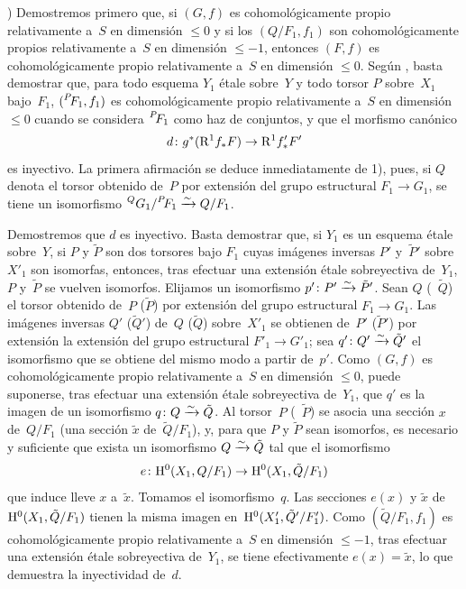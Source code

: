 ) Demostremos primero que, si $(G,f)$ es cohomológicamente propio
relativamente a~$S$ en dimensión $\leqslant 0$ y si los
$(Q/F_1,f_1)$ son cohomológicamente propios relativamente a~$S$ en
dimensión $\leqslant -1$, entonces $(F,f)$ es cohomológicamente propio
relativamente a~$S$ en dimensión $\leqslant 0$. Según
, basta demostrar que, para todo esquema $Y_1$ étale
sobre~$Y$ y todo torsor $P$ sobre~$X_1$ bajo~$F_1$,
$(\leftexp{P\mkern-4mu}{F}_1,f_1)$ es cohomológicamente propio
relativamente a~$S$ en dimensión $\leqslant 0$ cuando se considera
$\leftexp{P\mkern-4mu}{F}_1$ como haz de conjuntos, y que el morfismo
canónico
$$
d \colon g^*(\mathrm{R}^1 f_* F) \to \mathrm{R}^1 f'_* F'
$$
es inyectivo. La primera afirmación se deduce inmediatamente de 1),
pues, si $Q$ denota el torsor obtenido de~$P$ por extensión del grupo
estructural $F_1 \to G_1$, se tiene un isomorfismo
$\leftexp{Q}{G}_1 / \leftexp{P\mkern-4mu}{F}_1 \isomto Q/F_1$.

Demostremos que $d$ es inyectivo. Basta demostrar que, si $Y_1$ es un
esquema étale sobre~$Y$, si $P$ y $\tilde{P}$ son dos torsores bajo
$F_1$ cuyas imágenes inversas $P'$ y~$\tilde{P}'$ sobre~$X'_1$ son
isomorfas, entonces, tras efectuar una extensión étale sobreyectiva
de~$Y_1$, $P$ y~$\tilde{P}$ se vuelven isomorfos. Elijamos un
isomorfismo $p' \colon P' \xrightarrow{\sim} \tilde{P}'$. Sean $Q$
(\resp~$\tilde{Q}$) el torsor obtenido de~$P$ (\resp $\tilde{P}$) por
extensión del grupo estructural $F_1 \to G_1$. Las imágenes inversas
$Q'$ (\resp $\tilde{Q}'$) de~$Q$ (\resp $\tilde{Q}$) sobre~$X'_1$ se
obtienen de~$P'$ (\resp $\tilde{P}'$) por
{extensión}
{la extensión}
del grupo estructural $F'_1 \to G'_1$; sea
$q' \colon Q' \xrightarrow{\sim} \tilde{Q}'$ el isomorfismo que se obtiene del
mismo modo a partir de~$p'$. Como $(G,f)$ es cohomológicamente propio
relativamente a~$S$ en dimensión $\leqslant 0$, puede suponerse, tras
efectuar una extensión étale sobreyectiva de~$Y_1$, que $q'$ es la
imagen de un isomorfismo $q \colon Q \xrightarrow{\sim} \tilde{Q}$. Al torsor~$P$
(\resp~$\tilde{P}$) se asocia una sección $x$ de~$Q/F_1$ (\resp una
sección $\tilde{x}$ de~$\tilde{Q}/F_1$), y, para que $P$ y
$\tilde{P}$ sean isomorfos, es necesario y suficiente que exista un
isomorfismo $Q \xrightarrow{\sim} \tilde{Q}$ tal que el isomorfismo
$$
e \colon \mathrm H^0(X_1,Q/F_1) \to \mathrm H^0(X_1,\tilde{Q}/F_1)
$$
que induce lleve $x$ a~$\tilde{x}$. Tomamos el isomorfismo~$q$. Las
secciones $e(x)$ y $\tilde{x}$ de~$\mathrm H^0(X_1,\tilde{Q}/F_1)$ tienen la
misma imagen en~$\mathrm H^0(X'_1,\tilde{Q}'/F'_1)$. Como
$(\tilde{Q}/F_1,f_1)$ es cohomológicamente propio relativamente a~$S$
en dimensión $\leqslant -1$,
tras efectuar una extensión étale sobreyectiva de~$Y_1$, se tiene
efectivamente $e(x)=\tilde{x}$, lo que demuestra la inyectividad de~$d$.

